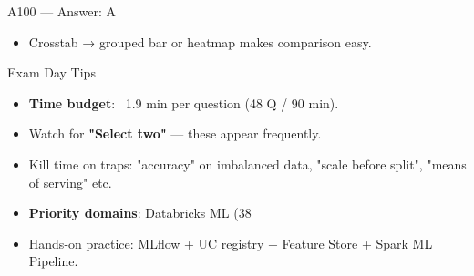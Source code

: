 \documentclass[aspectratio=169,10pt]{beamer}
\begin{document}
	\begin{frame}{A100 — Answer: A}
		\begin{itemize}
			\item Crosstab → grouped bar or heatmap makes comparison easy.
		\end{itemize}
	\end{frame}
	
	\begin{frame}{Exam Day Tips}
		\begin{itemize}
			\item \textbf{Time budget}: ~1.9 min per question (48 Q / 90 min).
			\item Watch for \textbf{"Select two"} — these appear frequently.
			\item Kill time on traps: "accuracy" on imbalanced data, "scale before split", "means of serving" etc.
			\item \textbf{Priority domains}: Databricks ML (38%
			\item Hands-on practice: MLflow + UC registry + Feature Store + Spark ML Pipeline.
		\end{itemize}
	\end{frame}
	
\end{document}
